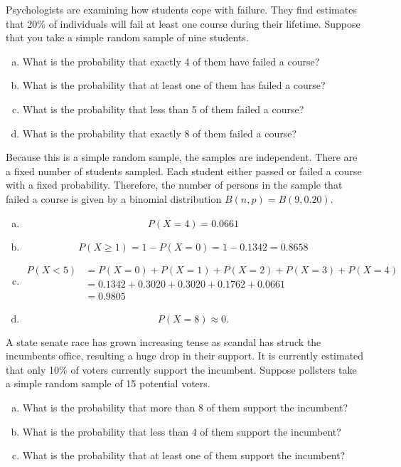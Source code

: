 \documentclass[11pt,letterpaper]{article}
\begin{document}

 Psychologists are examining how students cope with failure. They find estimates that 20\% of individuals will fail at least one course during their lifetime. Suppose that you take a simple random sample of nine students. 
	\begin{enumerate}[(a)]
	\item What is the probability that exactly 4 of them have failed a course?
	\item What is the probability that at least one of them has failed a course?
	\item What is the probability that less than 5 of them failed a course? 
	\item What is the probability that exactly 8 of them failed a course?
	\end{enumerate} \pspace

\sol Because this is a simple random sample, the samples are independent. There are a fixed number of students sampled. Each student either passed or failed a course with a fixed probability. Therefore, the number of persons in the sample that failed a course is given by a binomial distribution $B(n, p)= B(9, 0.20)$. 

\begin{enumerate}[(a)]
\item 
	\[
	P(X= 4)= 0.0661
	\] \pspace

\item 
	\[
	P(X \geq 1)= 1 - P(X= 0)= 1 - 0.1342= 0.8658
	\] \pspace

\item 
	\[
	\begin{aligned}
	P(X < 5)&= P(X= 0) + P(X= 1) + P(X= 2) + P(X= 3) + P(X= 4) \\[0.3cm]
	&= 0.1342 + 0.3020 + 0.3020 + 0.1762 + 0.0661\\[0.3cm]
	&= 0.9805
	\end{aligned}
	\] \pspace

\item 
	\[
	P(X= 8) \approx 0.
	\]
\end{enumerate}



\newpage



 A state senate race has grown increasing tense as scandal has struck the incumbents office, resulting a huge drop in their support. It is currently estimated that only 10\% of voters currently support the incumbent. Suppose pollsters take a simple random sample of 15 potential voters. 
	\begin{enumerate}[(a)]
	\item What is the probability that more than 8 of them support the incumbent? 
	\item What is the probability that less than 4 of them support the incumbent? 
	\item What is the probability that at least one of them support the incumbent?
	\end{enumerate} \pspace
\end{document}
